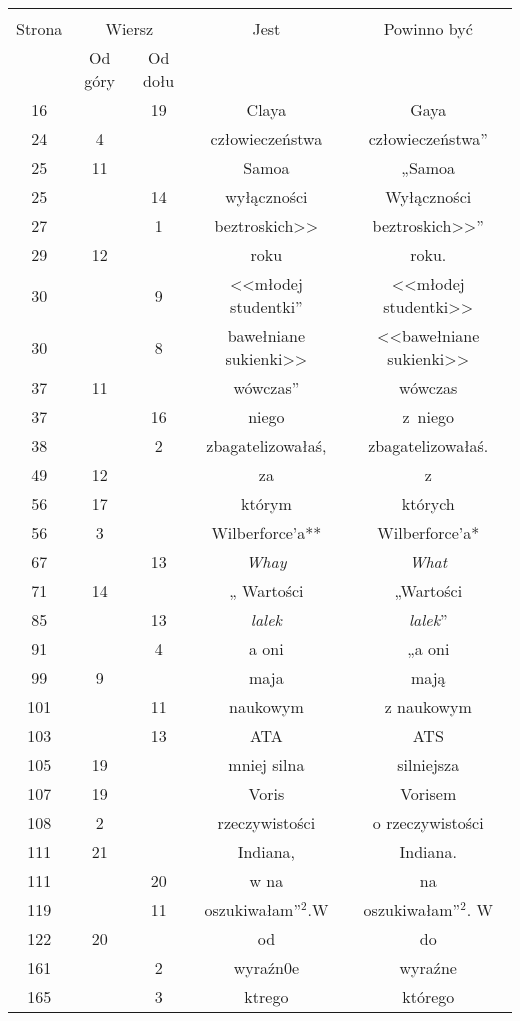 \documentclass[a4paper,11pt]{article}
\begin{document}
\begin{center}

  \begin{tabular}{|c|c|c|c|c|}
    \hline
    & \multicolumn{2}{c|}{} & & \\
    Strona & \multicolumn{2}{c|}{Wiersz} & Jest
                              & Powinno być \\ \cline{2-3}
    & Od góry & Od dołu & & \\
    \hline
    16  & & 19 & Claya & Gaya \\
    24  &  4 & & człowieczeństwa & człowieczeństwa'' \\
    25  & 11 & & Samoa & „Samoa \\
    25  & & 14 & wyłączności & Wyłączności \\
    27  & &  1 & beztroskich>> & beztroskich>>” \\
    29  & 12 & & roku & roku. \\
    30  & &  9 & <<młodej studentki” %
           & <<młodej studentki>> \\
    30  & &  8 & bawełniane sukienki>> & <<bawełniane sukienki>> \\
    37  & 11 & & wówczas” & wówczas \\
    37  & & 16 & niego & z~niego \\
    38  & &  2 & zbagatelizowałaś, & zbagatelizowałaś. \\
    49  & 12 & & za & z \\
    56  & 17 & & którym & których \\
    56  &  3 & & Wilberforce'a** & Wilberforce'a* \\
    67  & & 13 & \emph{Whay} & \emph{What} \\
    71  & 14 & & „ Wartości & „Wartości \\
    85  & & 13 & \emph{lalek} & \emph{lalek}” \\
    91  & &  4 & a oni & „a oni \\
    99  &  9 & & maja & mają \\
    101 & & 11 & naukowym & z naukowym \\
    103 & & 13 & ATA & ATS \\
    105 & 19 & & mniej silna & silniejsza \\
    107 & 19 & & Voris & Vorisem \\
    108 &  2 & & rzeczywistości & o rzeczywistości \\
    111 & 21 & & Indiana, & Indiana. \\
    111 & & 20 & w na & na \\
    119 & & 11 & oszukiwałam”$^{ 2 }$.W & oszukiwałam”$^{ 2 }$. W \\
    122 & 20 & & od & do \\
    161 & &  2 & wyraźn0e & wyraźne \\
    165 & &  3 & ktrego & którego \\
    \hline
  \end{tabular}






\end{center}
\end{document}
